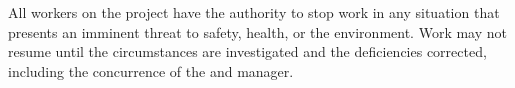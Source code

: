 All workers on the  project have the
authority to stop work in any situation that presents an imminent
threat to safety, health, or the environment. Work may not resume
until the circumstances are investigated and the deficiencies corrected,
including the concurrence of the  
and   manager.

